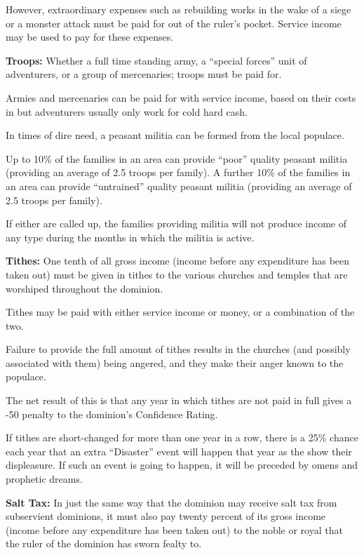 \begin{multicols*}{2}
However, extraordinary expenses such as rebuilding works in the wake of a siege or a monster attack must be paid for out of the ruler’s pocket. Service income may be used to pay for these expenses.

\textbf{Troops:} Whether a full time standing army, a “special forces” unit of adventurers, or a group of mercenaries; troops must be paid for.

Armies and mercenaries can be paid for with service income, based on their costs in  but adventurers usually only work for cold hard cash.

In times of dire need, a peasant militia can be formed from the local populace.

Up to 10\% of the families in an area can provide “poor” quality peasant militia (providing an average of 2.5 troops per family). A further 10\% of the families in an area can provide “untrained” quality peasant militia (providing an average of 2.5 troops per family).

If either are called up, the families providing militia will not produce income of any type during the months in which the militia is active.

\textbf{Tithes:} One tenth of all gross income (income before any expenditure has been taken out) must be given in tithes to the various churches and temples that are worshiped throughout the dominion.

Tithes may be paid with either service income or money, or a combination of the two.

Failure to provide the full amount of tithes results in the churches (and possibly  associated with them) being angered, and they make their anger known to the populace.

The net result of this is that any year in which tithes are not paid in full gives a -50 penalty to the dominion’s Confidence Rating.

If tithes are short-changed for more than one year in a row, there is a 25\% chance each year that an extra “Disaster” event will happen that year as the  show their displeasure. If such an event is going to happen, it will be preceded by omens and prophetic dreams.

\textbf{Salt Tax:} In just the same way that the dominion may receive salt tax from subservient dominions, it must also pay twenty percent of its gross income (income before any expenditure has been taken out) to the noble or royal that the ruler of the dominion has sworn fealty to.


\end{multicols*}
